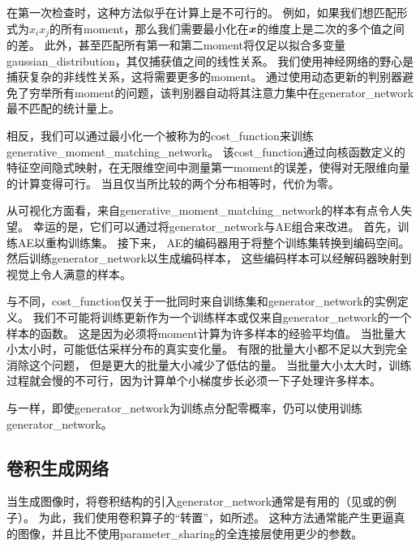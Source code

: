 在第一次检查时，这种方法似乎在计算上是不可行的。
例如，如果我们想匹配形式为$x_ix_j$的所有\gls{moment}，那么我们需要最小化在$\boldsymbol{\mathit{x}}$的维度上是二次的多个值之间的差。
此外，甚至匹配所有第一和第二\gls{moment}将仅足以拟合多变量\gls{gaussian_distribution}，其仅捕获值之间的线性关系。
我们使用神经网络的野心是捕获复杂的非线性关系，这将需要更多的\gls{moment}。
通过使用动态更新的判别器避免了穷举所有\gls{moment}的问题，该判别器自动将其注意力集中在\gls{generator_network}最不匹配的统计量上。


相反，我们可以通过最小化一个被称为\citep{scholkopf2002learning,gretton2012kernel}的\gls{cost_function}来训练\gls{generative_moment_matching_network}。
该\gls{cost_function}通过向核函数定义的特征空间隐式映射，在无限维空间中测量第一\gls{moment}的误差，使得对无限维向量的计算变得可行。
当且仅当所比较的两个分布相等时，代价为零。

从可视化方面看，来自\gls{generative_moment_matching_network}的样本有点令人失望。
幸运的是，它们可以通过将\gls{generator_network}与\gls{AE}组合来改进。
首先，训练\gls{AE}以重构训练集。
接下来， \gls{AE}的编码器用于将整个训练集转换到编码空间。
然后训练\gls{generator_network}以生成编码样本， 这些编码样本可以经解码器映射到视觉上令人满意的样本。

与不同，\gls{cost_function}仅关于一批同时来自训练集和\gls{generator_network}的实例定义。
我们不可能将训练更新作为一个训练样本或仅来自\gls{generator_network}的一个样本的函数。
这是因为必须将\gls{moment}计算为许多样本的经验平均值。
当批量大小太小时，可能低估采样分布的真实变化量。
有限的批量大小都不足以大到完全消除这个问题， 但是更大的批量大小减少了低估的量。
当批量大小太大时，训练过程就会慢的不可行，因为计算单个小梯度步长必须一下子处理许多样本。

与一样，即使\gls{generator_network}为训练点分配零概率，仍可以使用训练\gls{generator_network}。


\subsection{卷积生成网络}
\label{sec:convolutional_generative_networks}
当生成图像时，将卷积结构的引入\gls{generator_network}通常是有用的（见\citet{Goodfellow-et-al-NIPS2014-small}或\citet{dosovitskiy2015learning}的例子）。
为此，我们使用卷积算子的``转置''，如所述。
这种方法通常能产生更逼真的图像，并且比不使用\gls{parameter_sharing}的全连接层使用更少的参数。


